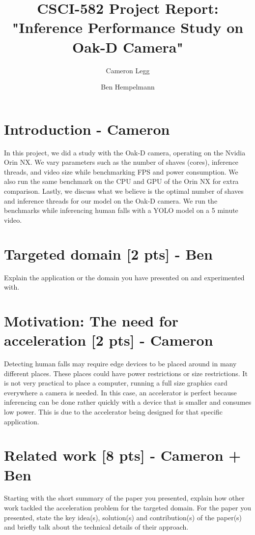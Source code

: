 \documentclass[sigconf,authorversion,nonacm]{acmart}
\begin{document}
\title{CSCI-582 Project Report: "Inference Performance Study on Oak-D Camera"}

\author{Cameron Legg}

\author{Ben Hempelmann}

\maketitle

\section{Introduction - Cameron}
In this project, we did a study with the Oak-D camera, operating on the Nvidia Orin NX. We vary parameters such as the number of shaves (cores), inference threads, and video size while benchmarking FPS and power consumption. We also run the same benchmark on the CPU and GPU of the Orin NX for extra comparison. Lastly, we discuss what we believe is the optimal number of shaves and inference threads for our model on the Oak-D camera. We run the benchmarks while inferencing human falls with a YOLO model on a 5 minute video.

\section{Targeted domain {\small [2 pts]} - Ben}
Explain the application or the domain you have presented on and experimented with. 

\section{Motivation: The need for acceleration {\small {[2 pts]}} - Cameron}

Detecting human falls may require edge devices to be placed around in many different places. These places could have power restrictions or size restrictions. It is not very practical to place a computer, running a full size graphics card everywhere a camera is needed. In this case, an accelerator is perfect because inferencing can be done rather quickly with a device that is smaller and consumes low power. This is due to the accelerator being designed for that specific application.

\section{Related work {\small {[8 pts]}} - Cameron + Ben}
Starting with the short summary of the paper you presented, explain how other work tackled the acceleration problem for the targeted domain. For the paper you presented, state the key idea(s), solution(s) and contribution(s) of the paper(s) and briefly talk about the technical details of their approach.
\end{document}
